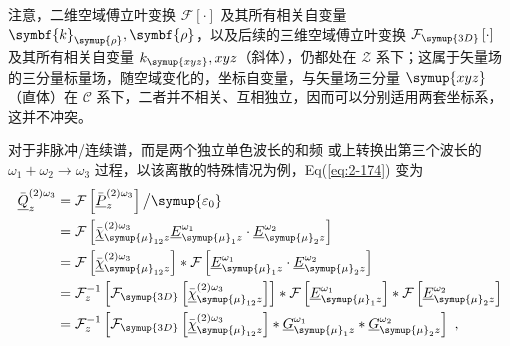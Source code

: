 注意，二维空域傅立叶变换 $\mathcal F \left[ \cdot \right]$ 及其所有相关自变量 $\symbf{k}_{\symup{\rho}}, \symbf{\rho}$，以及后续的三维空域傅立叶变换 $\mathcal F_{\symup{3D}} \left[ \cdot \right]$ 及其所有相关自变量 $k_{\symup{xyz}}, xyz$（斜体），仍都处在 $\mathcal Z$ 系下；这属于矢量场的三分量标量场，随空域变化的，坐标自变量，与矢量场三分量 $\symup{xyz}$（直体）在 $\mathcal C$ 系下，二者并不相关、互相独立，因而可以分别适用两套坐标系，这并不冲突。

对于非脉冲/连续谱，而是两个独立单色波长的和频 或上转换出第三个波长的 $\omega_1 + \omega_2 \to \omega_3$ 过程，以该离散的特殊情况为例，Eq(\ref{eq:2-174}) 变为
\begin{subequations} \label{eq:2-175}
	\abovedisplayskip=13pt
	\belowdisplayskip=13pt
	\begin{align}
		\bar{\underline{Q}}^{(2)\omega_3}_{z} &= \mathcal F \left[ \bar{\underline{P}}^{(2)\omega_3}_z \right] \big/ {\symup{\varepsilon_0}} \label{eq:2-175a} \\ &= \mathcal F \left[ \bar{\underline{\chi}}^{(2)\omega_3}_{ {\symup{\mu}}_{12}z} \underline{E}^{\omega_1}_{{\symup{\mu}}_1 z} \cdot \underline{E}^{\omega_2}_{{\symup{\mu}}_2 z} \right] \label{eq:2-175b} \\ &= \mathcal F \left[ \bar{\underline{\chi}}^{(2)\omega_3}_{ {\symup{\mu}}_{12}z} \right] * \mathcal F \left[ \underline{E}^{\omega_1}_{{\symup{\mu}}_1 z} \cdot \underline{E}^{\omega_2}_{{\symup{\mu}}_2 z} \right] \label{eq:2-175c} \\ &= \mathcal F^{-1}_{z} \left[ \mathcal F_{\symup{3D}} \left[ \bar{\underline{\chi}}^{(2)\omega_3}_{ {\symup{\mu}}_{12}z} \right] \right] * \mathcal F \left[ \underline{E}^{\omega_1}_{{\symup{\mu}}_1 z} \right] * \mathcal F \left[ \underline{E}^{\omega_2}_{{\symup{\mu}}_2 z} \right] \label{eq:2-175d} \\ &= \mathcal F^{-1}_{z} \left[ \mathcal F_{\symup{3D}} \left[ \bar{\underline{\chi}}^{(2)\omega_3}_{ {\symup{\mu}}_{12}z} \right] * \underline{G}^{\omega_1}_{{\symup{\mu}}_1 z} * \underline{G}^{\omega_2}_{{\symup{\mu}}_2 z} \right] \label{eq:2-175e}~,
	\end{align}
\end{subequations}
